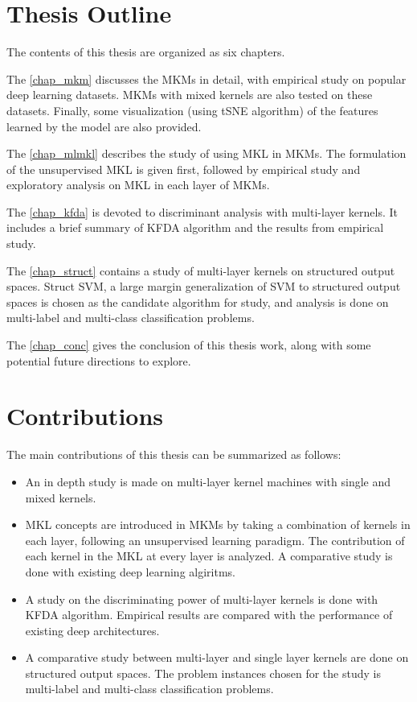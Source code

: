 \section{Thesis Outline}
\label{chap1_outline}
The contents of this thesis are organized as six chapters. 

The \autoref{chap_mkm} discusses the MKMs in detail, with empirical study on popular deep learning datasets. MKMs with mixed kernels are also tested on these datasets. Finally, some visualization (using tSNE algorithm) of the features learned by the model are also provided.

The \autoref{chap_mlmkl}  describes the study of using MKL in MKMs. The formulation of the unsupervised MKL is given first, followed by empirical study and exploratory analysis on MKL in each layer of MKMs.

The \autoref{chap_kfda} is devoted to discriminant analysis with multi-layer kernels. It includes a brief summary of KFDA algorithm and the results from empirical study.

The \autoref{chap_struct} contains a study of multi-layer kernels on structured output spaces. Struct SVM, a large margin generalization of SVM to structured output spaces is chosen as the candidate algorithm for study, and analysis is done on multi-label and multi-class classification problems.

The \autoref{chap_conc} gives the conclusion of this thesis work, along with some potential future directions to explore.

\section{Contributions}
\label{chap1_contri}
The main contributions of this thesis can be summarized as follows:
\begin{itemize}
\item An in depth study is made on multi-layer kernel machines with single and mixed kernels.
\item MKL concepts are introduced in MKMs by taking a combination of kernels in each layer, following an unsupervised learning paradigm. The contribution of each kernel in the MKL at every layer is analyzed. A comparative study is done with existing deep learning algiritms.
\item A study on the discriminating power of multi-layer kernels is done with KFDA algorithm. Empirical results are compared with the performance of existing deep architectures.
\item A comparative study between multi-layer and single layer kernels are done on structured output spaces. The problem instances chosen for the study is multi-label and multi-class classification problems.
\end{itemize}
